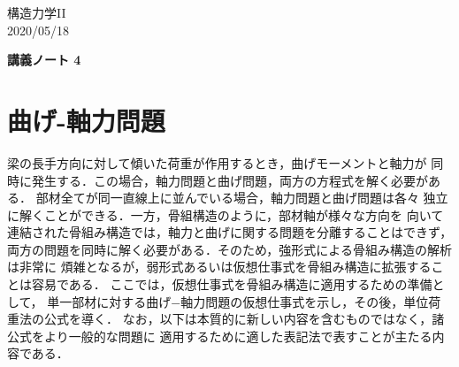﻿\documentclass[10pt,a4j]{jarticle}
\newlength{\minitwocolumn}
\begin{document}
\newcommand{\fat}[1]{\mbox{\boldmath $#1$}}
\newcommand{\D}{\partial}
\newcommand{\w}{\omega}
\newcommand{\ga}{\alpha}
\newcommand{\gb}{\beta}
\newcommand{\gx}{\xi}
\newcommand{\gz}{\zeta}
\newcommand{\vhat}[1]{\hat{\fat{#1}}}
\newcommand{\spc}{\vspace{0.7\baselineskip}}
\newcommand{\halfspc}{\vspace{0.3\baselineskip}}

\newcommand{\twofig}[2]
 {
   \begin{figure}
     \begin{minipage}[t]{\minitwocolumn}
         \begin{center}   #1
         \end{center}
     \end{minipage}
         \hspace{\columnsep}
     \begin{minipage}[t]{\minitwocolumn}
         \begin{center} #2
         \end{center}
     \end{minipage}
   \end{figure}
 }
\begin{flushright}
	構造力学II\\
	2020/05/18
\end{flushright}
\begin{center}
	{\LARGE \bf 講義ノート 4} \\
\end{center}
\setcounter{section}{3}
\section{曲げ-軸力問題}
梁の長手方向に対して傾いた荷重が作用するとき，曲げモーメントと軸力が
同時に発生する．この場合，軸力問題と曲げ問題，両方の方程式を解く必要がある．
部材全てが同一直線上に並んでいる場合，軸力問題と曲げ問題は各々
独立に解くことができる．一方，骨組構造のように，部材軸が様々な方向を
向いて連結された骨組み構造では，軸力と曲げに関する問題を分離することはできず，
両方の問題を同時に解く必要がある．そのため，強形式による骨組み構造の解析は非常に
煩雑となるが，弱形式あるいは仮想仕事式を骨組み構造に拡張することは容易である．
ここでは，仮想仕事式を骨組み構造に適用するための準備として，
単一部材に対する曲げ−軸力問題の仮想仕事式を示し，その後，単位荷重法の公式を導く．
なお，以下は本質的に新しい内容を含むものではなく，諸公式をより一般的な問題に
適用するために適した表記法で表すことが主たる内容である．
\end{document}
